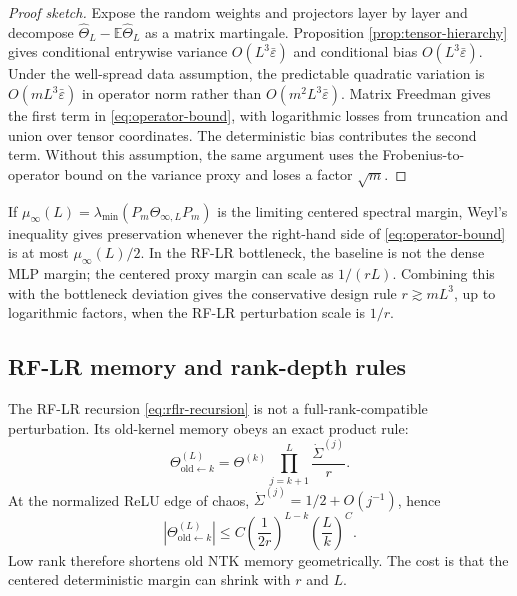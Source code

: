 \documentclass{article}
\newcommand{\E}{\mathbb E}
\newcommand{\wh}{\widehat}
\newcommand{\barE}{\bar\varepsilon}
\begin{document}
\begin{proof}[Proof sketch]
Expose the random weights and projectors layer by layer and decompose \(\wh\Theta_L-\E\wh\Theta_L\) as a matrix martingale. Proposition \ref{prop:tensor-hierarchy} gives conditional entrywise variance \(O(L^3\barE)\) and conditional bias \(O(L^3\barE)\). Under the well-spread data assumption, the predictable quadratic variation is \(O(mL^3\barE)\) in operator norm rather than \(O(m^2L^3\barE)\). Matrix Freedman gives the first term in \eqref{eq:operator-bound}, with logarithmic losses from truncation and union over tensor coordinates. The deterministic bias contributes the second term. Without this assumption, the same argument uses the Frobenius-to-operator bound on the variance proxy and loses a factor \(\sqrt m\).
\end{proof}

If \(\mu_\infty(L)=\lambda_{\min}(P_m\Theta_{\infty,L}P_m)\) is the limiting centered spectral margin, Weyl's inequality gives preservation whenever the right-hand side of \eqref{eq:operator-bound} is at most \(\mu_\infty(L)/2\). In the RF-LR bottleneck, the baseline is not the dense MLP margin; the centered proxy margin can scale as \(1/(rL)\). Combining this with the bottleneck deviation gives the conservative design rule \(r\gtrsim mL^3\), up to logarithmic factors, when the RF-LR perturbation scale is \(1/r\).

\subsection{RF-LR memory and rank-depth rules}
The RF-LR recursion \eqref{eq:rflr-recursion} is not a full-rank-compatible perturbation. Its old-kernel memory obeys an exact product rule:
\begin{equation}
\Theta^{(L)}_{\mathrm{old}\leftarrow k}
=\Theta^{(k)}\prod_{j=k+1}^{L}\frac{\dot\Sigma^{(j)}}{r}.
\label{eq:rflr-memory-product}
\end{equation}
At the normalized ReLU edge of chaos, \(\dot\Sigma^{(j)}=1/2+O(j^{-1})\), hence
\begin{equation}
\left|\Theta^{(L)}_{\mathrm{old}\leftarrow k}\right|
\le C\left(\frac1{2r}\right)^{L-k}\left(\frac{L}{k}\right)^C.
\label{eq:rflr-memory-bound}
\end{equation}
Low rank therefore shortens old NTK memory geometrically. The cost is that the centered deterministic margin can shrink with \(r\) and \(L\).
\end{document}
